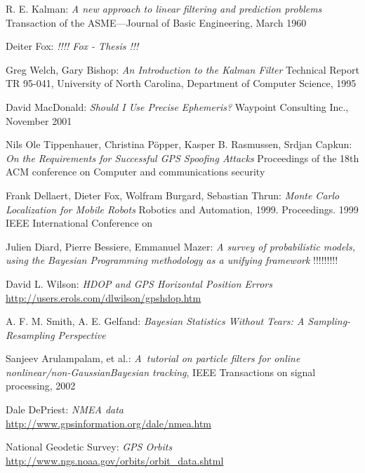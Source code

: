 \clearpage
{}
\begin{thebibliography}{99}


R. E. Kalman:
\emph{A new approach to linear filtering and prediction problems}
Transaction of the ASME—Journal of Basic Engineering, March 1960

Deiter Fox:
\emph{!!!! Fox - Thesis !!!}

Greg Welch,
Gary Bishop:
\emph{An Introduction to the Kalman Filter}
Technical Report TR 95-041, University of North Carolina,
Department of Computer Science, 1995

David MacDonald:
\emph{Should I Use Precise Ephemeris?}
Waypoint Consulting Inc.,
November 2001

Nils Ole Tippenhauer,
Christina Pöpper,
Kasper B. Rasmussen,
Srdjan Capkun:
\emph{On the Requirements for Successful GPS Spoofing Attacks}
Proceedings of the 18th ACM conference on Computer and communications security

Frank Dellaert,
Dieter Fox,
Wolfram Burgard,
Sebastian Thrun:
\emph{Monte Carlo Localization for Mobile Robots}
Robotics and Automation, 1999. Proceedings. 1999 IEEE International Conference on

Julien Diard,
Pierre Bessiere,
Emmanuel Mazer:
\emph{A survey of probabilistic models, using the Bayesian Programming
methodology as a unifying framework}
!!!!!!!!!


David L. Wilson:
\emph{HDOP and GPS Horizontal Position Errors} \\
\url{http://users.erols.com/dlwilson/gpshdop.htm}

A. F. M. Smith,
A. E. Gelfand:
\emph{Bayesian Statistics Without Tears: A Sampling-Resampling Perspective}

Sanjeev Arulampalam, et al.:
{\em A~tutorial on particle filters for online nonlinear/non-GaussianBayesian tracking},
IEEE Transactions on signal processing, 2002

Dale DePriest:
\emph{NMEA data} \\
\url{http://www.gpsinformation.org/dale/nmea.htm}

National Geodetic Survey:
\emph{GPS Orbits} \\
\url{http://www.ngs.noaa.gov/orbits/orbit_data.shtml}

\end{thebibliography}
